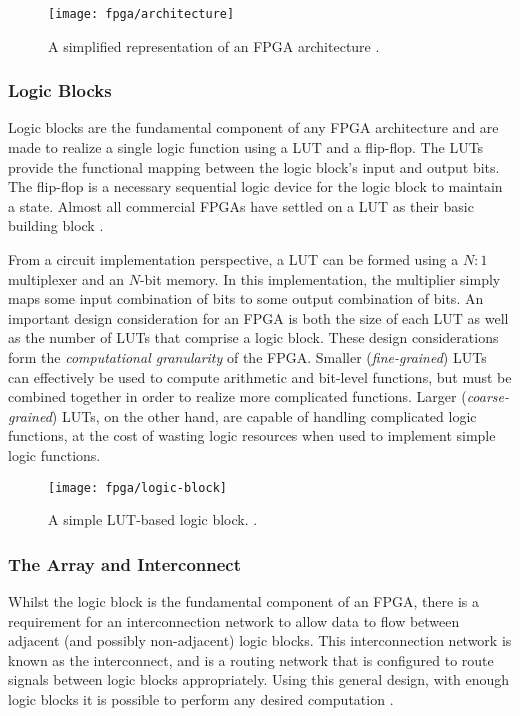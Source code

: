 \begin{figure}
    \centering
    \texttt{[image: fpga/architecture]}
    \caption[A simplified representation of an \gls{FPGA} architecture.]
        {A simplified representation of an \gls{FPGA} architecture
        \cite{Hauck:2007}.}
    \label{fig:fpga:architecture}
\end{figure}

\subsubsection{Logic Blocks}
\label{fpga:architecture:logicBlocks}
Logic blocks are the fundamental component of any \gls{FPGA} architecture and
are made to realize a single logic function using a \gls{LUT} and a flip-flop.
The \glspl{LUT} provide the functional mapping between the logic block's input
and output bits. The flip-flop is a necessary sequential logic device for the
logic block to maintain a state. Almost all commercial \glspl{FPGA} have settled
on a \gls{LUT} as their basic building block \cite{Hauck:2007}.

From a circuit implementation perspective, a \gls{LUT} can be formed using a
$N:1$ multiplexer and an $N$-bit memory. In this implementation, the multiplier
simply maps some input combination of bits to some output combination of bits.
An important design consideration for an \gls{FPGA} is both the size of each
\gls{LUT} as well as the number of \glspl{LUT} that comprise a logic block.
These design considerations form the \emph{computational granularity} of the
\gls{FPGA}. Smaller (\emph{fine-grained}) \glspl{LUT} can effectively be used to
compute arithmetic and bit-level functions, but must be combined together in
order to realize more complicated functions. Larger (\emph{coarse-grained})
\glspl{LUT}, on the other hand, are capable of handling complicated logic
functions, at the cost of wasting logic resources when used to implement simple
logic functions.

\begin{figure}
    \centering
    \texttt{[image: fpga/logic-block]}
    \caption[A simple \gls{LUT}-based logic block.]
        {A simple \gls{LUT}-based logic block. \cite{Hauck:2007}.}
    \label{fig:fpga:logicBlock}
\end{figure}

\subsubsection{The Array and Interconnect}
\label{fpga:architecture:arrayAndInterconnect}
Whilst the logic block is the fundamental component of an \gls{FPGA}, there is a
requirement for an interconnection network to allow data to flow between
adjacent (and possibly non-adjacent) logic blocks. This interconnection network
is known as the interconnect, and is a routing network that is configured to
route signals between logic blocks appropriately. Using this general design,
with enough logic blocks it is possible to perform any desired computation
\cite{Hauck:2007}.

